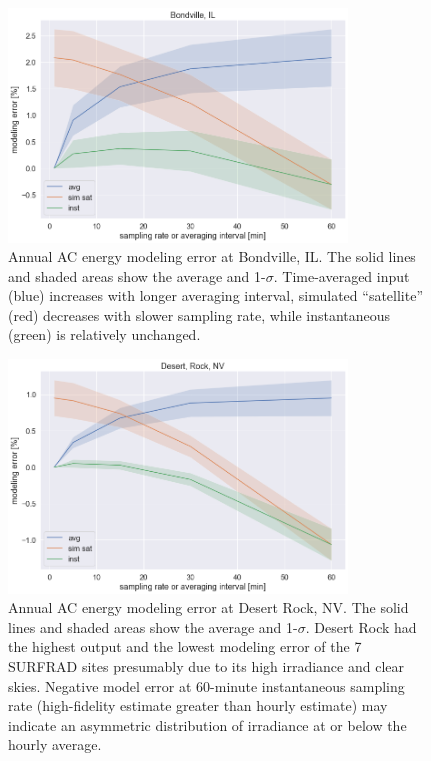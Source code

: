 \documentclass[conference]{IEEEtran}
\begin{document}
\begin{figure}[htbp]
\centerline{\includegraphics[width=9cm]{analysis/bon_all.png}}
\caption{Annual AC energy modeling error at Bondville, IL. The solid lines and shaded areas show the average and 1-$\sigma$. Time-averaged input (blue) increases with longer averaging interval, simulated ``satellite'' (red) decreases with slower sampling rate, while instantaneous (green) is relatively unchanged.}
\label{fig:bon2010}
\end{figure}

\begin{figure}[htbp]
\centerline{\includegraphics[width=9cm]{analysis/dra_all.png}}
\caption{Annual AC energy modeling error at Desert Rock, NV. The solid lines and shaded areas show the average and 1-$\sigma$. Desert Rock had the highest output and the lowest modeling error of the 7 SURFRAD sites presumably due to its high irradiance and clear skies. Negative model error at 60-minute instantaneous sampling rate (high-fidelity estimate greater than hourly estimate) may indicate an asymmetric distribution of irradiance at or below the hourly average.}
\label{fig:dra2011}
\end{figure}
\end{document}
